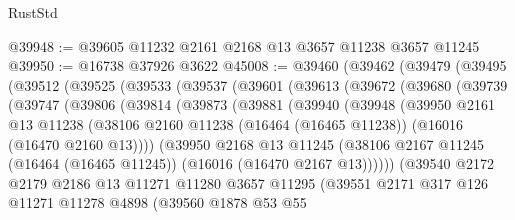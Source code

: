 \begin{lexlean}{RustStd}
\begin{coremodule}
@39948 := @39605 @11232 @2161 @2168 @13 @3657 @11238 @3657 @11245
@39950 := @16738 @37926 @3622
@45008 := @39460
    (@39462
      (@39479
        (@39495
          (@39512
            (@39525
              (@39533
                (@39537
                  (@39601
                    (@39613
                      (@39672
                        (@39680
                          (@39739
                            (@39747
                              (@39806
                                (@39814
                                  (@39873
                                    (@39881
                                      (@39940
                                        (@39948
                                          (@39950
                                            @2161
                                            @13
                                            @11238
                                            (@38106
                                              @2160
                                              @11238
                                              (@16464 (@16465 @11238))
                                              (@16016 (@16470 @2160 @13))))
                                          (@39950
                                            @2168
                                            @13
                                            @11245
                                            (@38106
                                              @2167
                                              @11245
                                              (@16464 (@16465 @11245))
                                              (@16016 (@16470 @2167 @13))))))
                                      (@39540
                                        @2172
                                        @2179
                                        @2186
                                        @13
                                        @11271
                                        @11280
                                        @3657
                                        @11295
                                        (@39551
                                          @2171
                                          @317
                                          @126
                                          @11271
                                          @11278
                                          @4898
                                          (@39560
                                            @1878
                                            @53
                                            @55

\end{coremodule}
\end{lexlean}
